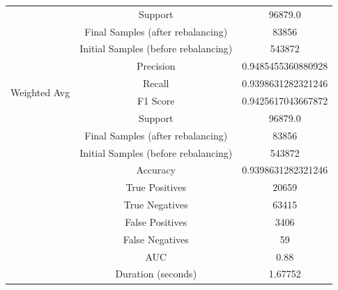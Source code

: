 \begin{longtable}{|c|c|c|}
 & Support & 96879.0 \\
 & Final Samples (after rebalancing) & 83856 \\
 & Initial Samples (before rebalancing) & 543872 \\
\hline
\multirow{4}{*}{Weighted Avg} & Precision & 0.9485455360880928 \\
 & Recall & 0.9398631282321246 \\
 & F1 Score & 0.9425617043667872 \\
 & Support & 96879.0 \\
 & Final Samples (after rebalancing) & 83856 \\
 & Initial Samples (before rebalancing) & 543872 \\
\hline
& Accuracy & 0.9398631282321246 \\ \hline
& True Positives & 20659 \\ \hline
& True Negatives & 63415 \\ \hline
& False Positives & 3406 \\ \hline
& False Negatives & 59 \\ \hline
& AUC & 0.88 \\ \hline
& Duration (seconds) & 1.67752 \\ \hline
\end{longtable}


